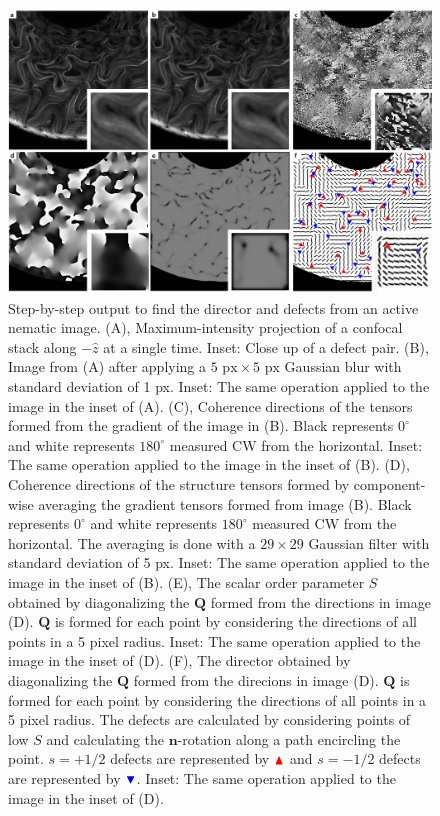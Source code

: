 \begin{figure}[h!]
  \centering
  \includegraphics[width=\textwidth]{figures/C3/Ch3-Figs_CEDF2.png}
  \caption{Step-by-step output to find the director and defects from an active nematic image.
(A), Maximum-intensity projection of a confocal stack along $-\hat{z}$ at a single time.
Inset: Close up of a defect pair.
(B), Image from (A) after applying a $5 \textrm{ px} \times 5 \textrm{ px}$ Gaussian blur with standard deviation of 1 px.
Inset: The same operation applied to the image in the inset of (A).
(C), Coherence directions of the tensors formed from the gradient of the image in (B).
Black represents $0^{\circ}$ and white represents $180^{\circ}$ measured CW from the horizontal.
Inset: The same operation applied to the image in the inset of (B).
(D), Coherence directions of the structure tensors formed by component-wise averaging the gradient tensors formed from image (B).
Black represents $0^{\circ}$ and white represents $180^{\circ}$ measured CW from the horizontal.
The averaging is done with a $29 \times 29$ Gaussian filter with standard deviation of 5 px.
Inset: The same operation applied to the image in the inset of (B).
(E), The scalar order parameter $S$ obtained by diagonalizing the $\mathbf{Q}$ formed from the directions in image (D).
$\mathbf{Q}$ is formed for each point by considering the directions of all points in a 5 pixel radius.
Inset: The same operation applied to the image in the inset of (D).
(F), The director obtained by diagonalizing the $\mathbf{Q}$ formed from the direcions in image (D).
$\mathbf{Q}$ is formed for each point by considering the directions of all points in a 5 pixel radius.
The defects are calculated by considering points of low $S$ and calculating the $\mathbf{n}$-rotation along a path encircling the point.
$s = +1/2$ defects are represented by ${\color{red} \blacktriangle  } $  and $s = -1/2$ defects are represented by ${ \color{blue} \blacktriangledown  } $.
Inset: The same operation applied to the image in the inset of (D).}\label{f:3-CEDF2}
\end{figure}
\newpage
